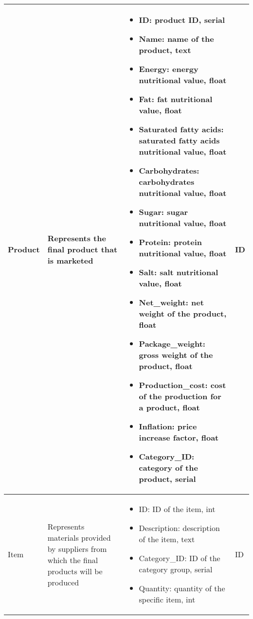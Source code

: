 \begin{longtable}{|p{}|p{} |p{}|p{} |}
    Product & Represents the final product that is marketed &
    \begin{itemize}
        \vspace{-1em}
        \item ID:   product ID, serial
        \item Name:   name of the product, text
        \item Energy:   energy nutritional value, float
        \item Fat:   fat nutritional value, float
        \item Saturated fatty acids:   saturated fatty acids nutritional value, float
        \item Carbohydrates:   carbohydrates nutritional value, float
        \item Sugar:   sugar nutritional value, float
        \item Protein:   protein nutritional value, float
        \item Salt:   salt nutritional value, float
        \item Net\_weight:   net weight of the product, float
        \item Package\_weight:   gross weight of the product, float
        \item Production\_cost:   cost of the production for a product, float
        \item Inflation:   price increase factor, float                         %
        \item Category\_ID:   category of the product, serial
    \end{itemize}
    &  ID \\\hline

    Item & Represents materials provided by suppliers from which the final products will be produced &
    \begin{itemize}
        \vspace{-1em}
        \item ID:   ID of the item, int
        \item Description:   description of the item, text
        \item Category\_ID:   ID of the category group, serial
        \item Quantity:   quantity of the specific item, int
    \end{itemize}
    &  ID \\\hline


\end{longtable}
